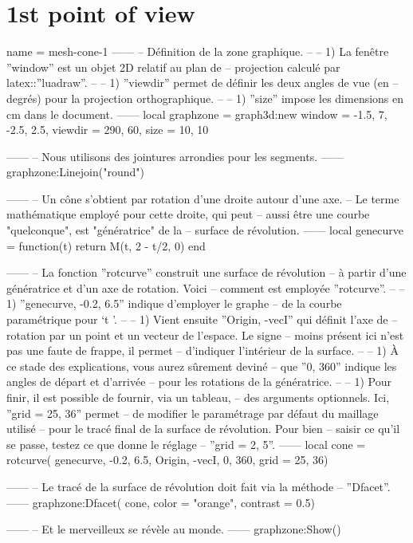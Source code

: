 \documentclass[varwidth, border = 3pt]{standalone}
\begin{document}
\section*{1st point of view}

\begin{luadraw}{name = mesh-cone-1}
------
-- Définition de la zone graphique.
--
--     1) La fenêtre ''window'' est un objet 2D relatif au plan de
--     projection calculé par latex::''luadraw''.
--
--     1) ''viewdir'' permet de définir les deux angles de vue (en
--     degrés) pour la projection orthographique.
--
--     1) ''size'' impose les dimensions en cm dans le document.
------
    local graphzone = graph3d:new{
        window  = {-1.5, 7, -2.5, 2.5},
        viewdir = {290, 60},
        size    = {10, 10}
    }

------
-- Nous utilisons des jointures arrondies pour les segments.
------
    graphzone:Linejoin("round")

------
-- Un cône s'obtient par rotation d'une droite autour d'une axe.
-- Le terme mathématique employé pour cette droite, qui peut
-- aussi être une courbe "quelconque", est "génératrice" de la
-- surface de révolution.
------
    local genecurve = function(t)
        return M(t, 2 - t/2, 0)
    end

------
-- La fonction ''rotcurve'' construit une surface de révolution
-- à partir d'une génératrice et d'un axe de rotation. Voici
-- comment est employée ''rotcurve''.
--
--     1) ''genecurve, -0.2, 6.5'' indique d'employer le graphe
--     de la courbe paramétrique pour `t \in [-0.2 .. 6.5]'.
--
--     1) Vient ensuite ''{Origin, -vecI}'' qui définit l'axe de
--     rotation par un point et un vecteur de l'espace. Le signe
--     moins présent ici n'est pas une faute de frappe, il permet
--     d'indiquer l'intérieur de la surface.
--
--     1) À ce stade des explications, vous aurez sûrement deviné
--     que ''0, 360'' indique les angles de départ et d'arrivée
--     pour les rotations de la génératrice.
--
--     1) Pour finir, il est possible de fournir, via un tableau,
--     des arguments optionnels. Ici, ''grid = {25, 36}'' permet
--     de modifier le paramétrage par défaut du maillage utilisé
--     pour le tracé final de la surface de révolution. Pour bien
--     saisir ce qu'il se passe, testez ce que donne le réglage
--     ''grid = {2, 5}''.
------
    local cone = rotcurve(
        genecurve, -0.2, 6.5,
        {Origin, -vecI},
        0, 360,
        {grid = {25, 36}})

------
-- Le tracé de la surface de révolution doit fait via la méthode
-- ''Dfacet''.
------
    graphzone:Dfacet(
   	    cone,
        {color    = "orange",
		 contrast = 0.5})

------
-- Et le merveilleux se révèle au monde.
------
    graphzone:Show()
\end{luadraw}
\end{document}
